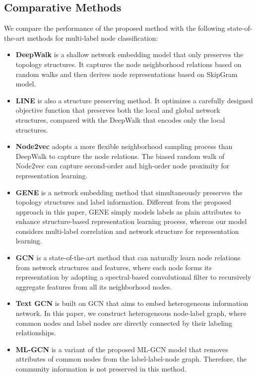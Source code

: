\documentclass[conference]{IEEEtran}
\begin{document}
\subsection{Comparative Methods}
We compare the performance of the proposed method with the following state-of-the-art methods for multi-label node classification:
\begin{itemize}
    \item \textbf{DeepWalk} \cite{21} is a shallow network embedding model that only preserves the topology structures. It captures the node neighborhood relations based on random walks and then derives node representations based on SkipGram model.
    \item \textbf{LINE} \cite{23} is also a structure preserving method. It optimizes a carefully designed objective function
    that preserves both the local and global network structures, compared with the DeepWalk that encodes only the local structures.
    \item \textbf{Node2vec} \cite{26} adopts a more flexible neighborhood sampling process than DeepWalk to capture the node relations. The biased random walk of Node2vec can capture second-order and high-order node proximity for representation learning.
    \item \textbf{GENE} \cite{12} is a network embedding method that simultaneously preserves the topology structures and label information. Different from the proposed approach in this paper, GENE simply models labels as plain attributes to enhance structure-based representation learning process, whereas our model considers multi-label correlation and network structure for representation learning. 
    \item \textbf{GCN} \cite{14} is a state-of-the-art method that can naturally learn node relations from network structures and features, where each node forms its representation by adopting a spectral-based convolutional filter to recursively aggregate features from all its neighborhood nodes.
    \item \textbf{Text GCN} \cite{25} is built on GCN that aims to embed heterogeneous information network. In this paper, we construct  heterogeneous node-label graph, where common nodes and label nodes are directly connected by their labeling relationships.
    \item \textbf{ML-GCN} is a variant of the proposed ML-GCN model that removes attributes of common nodes from the label-label-node graph. Therefore, the community information is not preserved in this method.


\end{itemize}
\end{document}
